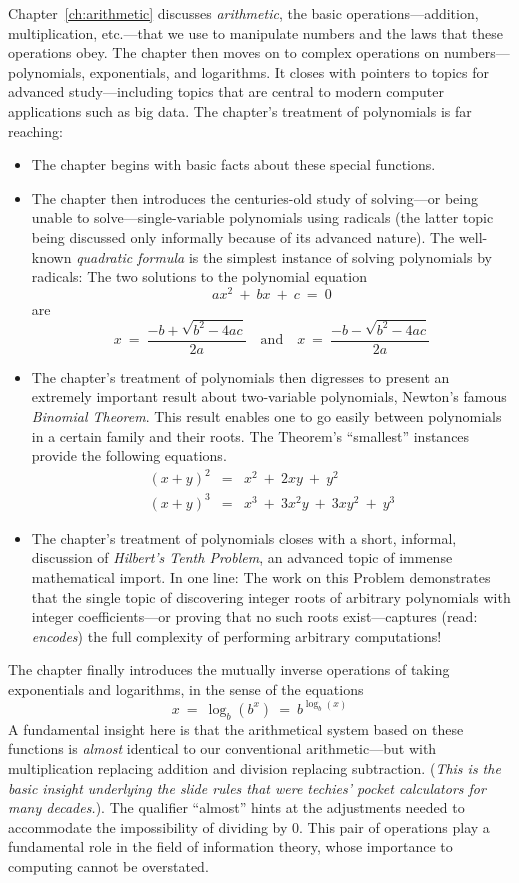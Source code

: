 Chapter~\ref{ch:arithmetic} discusses {\it arithmetic}, the basic operations---addition, multiplication, etc.---that we use to manipulate numbers and the laws that these operations obey.  The chapter then moves on to complex operations on numbers---polynomials, exponentials, and logarithms.  It closes with pointers to topics for advanced study---including topics that are central to modern computer applications such as big data.  The chapter's treatment of polynomials is far reaching:
\begin{itemize}
\item
The chapter begins with basic facts about these special functions.
\medskip\item
The chapter then introduces the centuries-old study of solving---or being unable to solve---single-variable polynomials using radicals (the latter topic being discussed only informally because of its
advanced nature).  The well-known {\it quadratic formula} is the simplest instance of solving polynomials by radicals: The two solutions to the polynomial equation
\[ ax^2 \ + \ bx \ + \ c \ = \ 0 \]
are
\[ x \ = \ \frac{-b + \sqrt{b^2 - 4ac}}{2a}
 \ \ \ \mbox{ and } \ \ \
   x \ = \ \frac{-b - \sqrt{b^2 - 4ac}}{2a}
\]
\medskip\item
The chapter's treatment of polynomials then digresses to present an extremely important result about two-variable polynomials, Newton's famous {\it Binomial Theorem}.  This result enables one to go easily between polynomials in a certain family and their roots.  The Theorem's ``smallest'' instances provide the following equations.
\begin{eqnarray*}
(x + y)^2 & = & x^2 \ + \ 2xy \ + \ y^2 \\
(x + y)^3 & = & x^3 \ + \ 3x^2y \ + \ 3 xy^2 \ + \ y^3
\end{eqnarray*}
\medskip\item
The chapter's treatment of polynomials closes with a short, informal, discussion of {\it Hilbert's Tenth Problem}, an advanced topic of immense mathematical import.  In one line: The work on this Problem demonstrates that the single topic of discovering integer roots of arbitrary polynomials with integer coefficients---or proving that no such roots exist---captures (read: {\em encodes}) the full complexity of performing arbitrary computations!
\end{itemize}
The chapter finally introduces the mutually inverse operations of taking exponentials and logarithms, in the sense of the equations
\[  x \ = \ \log_b(b^x) \ = \ b^{\log_b(x)} \]
A fundamental insight here is that the arithmetical system based on these functions is {\em almost} identical to our conventional arithmetic---but with multiplication replacing addition and division replacing subtraction.  ({\em This is the basic insight underlying the {\em slide rules} that were techies' pocket calculators for many decades.}). The qualifier ``almost'' hints at the adjustments needed to accommodate the impossibility of dividing by $0$.  This pair of operations play a fundamental role in the field of information theory, whose importance to computing cannot be overstated.

